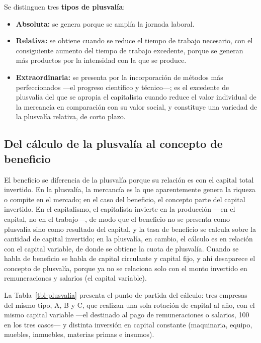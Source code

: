 \documentclass[
  man,
  floatsintext,
  longtable,
  a4paper,
  nolmodern,
  notxfonts,
  notimes,
  12pt,
  colorlinks=true,linkcolor=blue,citecolor=blue,urlcolor=blue]{apa7}
\providecommand{\tightlist}{%
  \setlength{\itemsep}{0pt}\setlength{\parskip}{0pt}}
\begin{document}
Se distinguen tres \textbf{tipos de plusvalía}:

\begin{itemize}
\tightlist
\item
  \textbf{Absoluta:} se genera porque se amplía la jornada laboral.
\item
  \textbf{Relativa:} se obtiene cuando se reduce el tiempo de trabajo
  necesario, con el consiguiente aumento del tiempo de trabajo
  excedente, porque se generan más productos por la intensidad con la
  que se produce.
\item
  \textbf{Extraordinaria:} se presenta por la incorporación de métodos
  más perfeccionados ---el progreso científico y técnico---; es el
  excedente de plusvalía del que se apropia el capitalista cuando reduce
  el valor individual de la mercancía en comparación con su valor
  social, y constituye una variedad de la plusvalía relativa, de corto
  plazo.
\end{itemize}

\subsection{Del cálculo de la plusvalía al concepto de
beneficio}\label{del-cuxe1lculo-de-la-plusvaluxeda-al-concepto-de-beneficio}

El beneficio se diferencia de la plusvalía porque su relación es con el
capital total invertido. En la plusvalía, la mercancía es la que
aparentemente genera la riqueza o compite en el mercado; en el caso del
beneficio, el concepto parte del capital invertido. En el capitalismo,
el capitalista invierte en la producción ---en el capital, no en el
trabajo---, de modo que el beneficio no se presenta como plusvalía sino
como resultado del capital, y la tasa de beneficio se calcula sobre la
cantidad de capital invertido; en la plusvalía, en cambio, el cálculo es
en relación con el capital variable, de donde se obtiene la cuota de
plusvalía. Cuando se habla de beneficio se habla de capital circulante y
capital fijo, y ahí desaparece el concepto de plusvalía, porque ya no se
relaciona solo con el monto invertido en remuneraciones y salarios (el
capital variable).

La Tabla~\ref{tbl-plusvalia} presenta el punto de partida del cálculo:
tres empresas del mismo tipo, A, B y C, que realizan una sola rotación
de capital al año, con el mismo capital variable ---el destinado al pago
de remuneraciones o salarios, 100 en los tres casos--- y distinta
inversión en capital constante (maquinaria, equipo, muebles, inmuebles,
materias primas e insumos).
\end{document}
